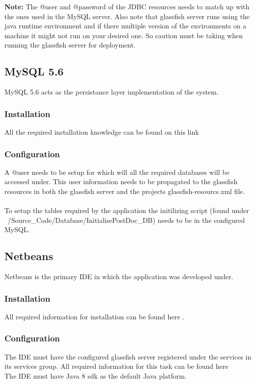 \documentclass[12pt]{article}
\begin{document}
\textbf{Note:} The @user and @password of the JDBC resources needs to match up with the ones used in the MySQL server. Also note that glassfish server runs using the java runtime environment and if there multiple version of the environments on a machine it might not run on your desired one. So caution must be taking when running the glassfish server for deployment.\\
\subsection{MySQL 5.6}
MySQL 5.6 acts as the persistance layer implementation of the system.

\subsubsection{Installation}
All the required installation knowledge can be found on this link \textbf{} 

\subsubsection{Configuration}
A @user needs to be setup for which will all the required databases will be accessed under. This user information needs to be propagated to the glassfish resources in both the glassfish server and the projects glassfish-resourcs.xml file.
\\
\\
To setup the tables required by the application the initilizing script (found under ~/Source_Code/Database/InitialisePostDoc_DB) needs to be in the configured MySQL.

\subsection{Netbeans} 
Netbeans is the primary IDE in which the application was developed under.

\subsubsection{Installation}
All required information for installation can be found here \textbf{}.

\subsubsection{Configuration}
The IDE must have the configured glassfish server registered under the services in its services group. All required information for this task can be found here \textbf{}
\\
The IDE must have Java 8 sdk as the default Java platform.
\end{document}
